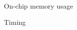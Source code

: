 \documentclass[t]{beamer}
\begin{document}
\begin{frame}{On-chip memory usage}
  
\end{frame}

\begin{frame}{Timing}
  
\end{frame}

\begin{darkframes}
\end{darkframes}
\end{document}
